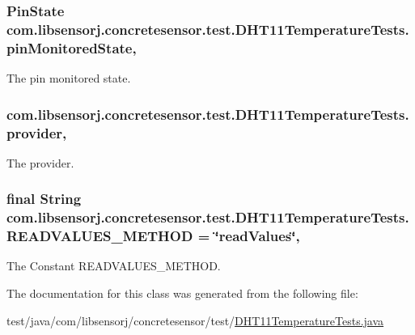 \subsubsection[{pin\+Monitored\+State}]{\setlength{\rightskip}{0pt plus 5cm}Pin\+State com.\+libsensorj.\+concretesensor.\+test.\+D\+H\+T11\+Temperature\+Tests.\+pin\+Monitored\+State\hspace{0.3cm}{\ttfamily [static]}, {\ttfamily [private]}}\label{classcom_1_1libsensorj_1_1concretesensor_1_1test_1_1DHT11TemperatureTests_a0b1e8ff10deeef685ecc52fe4254e239}
The pin monitored state. \hypertarget{classcom_1_1libsensorj_1_1concretesensor_1_1test_1_1DHT11TemperatureTests_ada4cbdf40a6bcf6a09aff3cf8603f649}{}
\subsubsection[{provider}]{ com.\+libsensorj.\+concretesensor.\+test.\+D\+H\+T11\+Temperature\+Tests.\+provider\hspace{0.3cm}{\ttfamily [static]}, {\ttfamily [private]}}\label{classcom_1_1libsensorj_1_1concretesensor_1_1test_1_1DHT11TemperatureTests_ada4cbdf40a6bcf6a09aff3cf8603f649}
The provider. \hypertarget{classcom_1_1libsensorj_1_1concretesensor_1_1test_1_1DHT11TemperatureTests_a2e6886cd64d8982ff792d10404bca66f}{}
\subsubsection[{R\+E\+A\+D\+V\+A\+L\+U\+E\+S\+\_\+\+M\+E\+T\+H\+O\+D}]{\setlength{\rightskip}{0pt plus 5cm}final String com.\+libsensorj.\+concretesensor.\+test.\+D\+H\+T11\+Temperature\+Tests.\+R\+E\+A\+D\+V\+A\+L\+U\+E\+S\+\_\+\+M\+E\+T\+H\+O\+D = \char`\"{}read\+Values\char`\"{}\hspace{0.3cm}{\ttfamily [static]}, {\ttfamily [private]}}\label{classcom_1_1libsensorj_1_1concretesensor_1_1test_1_1DHT11TemperatureTests_a2e6886cd64d8982ff792d10404bca66f}
The Constant R\+E\+A\+D\+V\+A\+L\+U\+E\+S\+\_\+\+M\+E\+T\+H\+O\+D. 

The documentation for this class was generated from the following file\+:\begin{DoxyCompactItemize}
\item 
test/java/com/libsensorj/concretesensor/test/\hyperlink{DHT11TemperatureTests_8java}{D\+H\+T11\+Temperature\+Tests.\+java}\end{DoxyCompactItemize}
